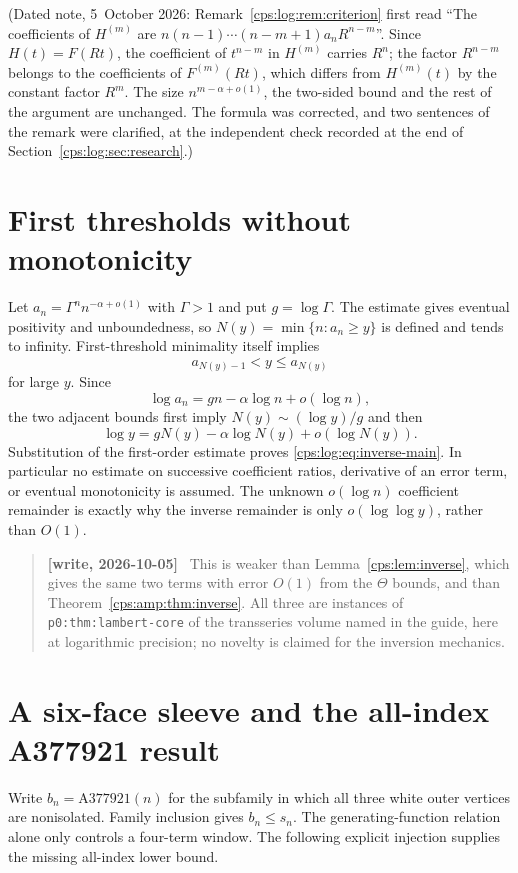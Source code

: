 \documentclass[11pt,letterpaper]{article}
\numberwithin{equation}{section}
\theoremstyle{remark}\newtheorem{remark}[theorem]{Remark}
\newenvironment{writenotelog}{\begin{quote}\small\sloppy\textbf{[write, 2026-10-05]}\ }{\end{quote}}
\begin{document}
\noindent(Dated note, 5~October 2026: Remark~\ref{cps:log:rem:criterion} first read ``The
coefficients of $H^{(m)}$ are $n(n-1)\cdots(n-m+1)a_nR^{n-m}$''. Since $H(t)=F(Rt)$, the
coefficient of $t^{n-m}$ in $H^{(m)}$ carries $R^{n}$; the factor $R^{n-m}$ belongs to the
coefficients of $F^{(m)}(Rt)$, which differs from $H^{(m)}(t)$ by the constant factor $R^{m}$.
The size $n^{m-\alpha+o(1)}$, the two-sided bound and the rest of the argument are unchanged. The
formula was corrected, and two sentences of the remark were clarified, at the independent check
recorded at the end of Section~\ref{cps:log:sec:research}.)

\section{First thresholds without monotonicity}\label{cps:log:sec:inverse}
Let $a_n=\Gamma^n n^{-\alpha+o(1)}$ with $\Gamma>1$ and put
$g=\log\Gamma$. The estimate gives eventual positivity and
unboundedness, so $N(y)=\min\{n:a_n\ge y\}$ is defined and tends
to infinity. First-threshold minimality itself implies
\[
 a_{N(y)-1}<y\le a_{N(y)}
\]
for large $y$. Since
\[
 \log a_n=gn-\alpha\log n+o(\log n),
\]
the two adjacent bounds first imply $N(y)\sim(\log y)/g$ and then
\[
 \log y=gN(y)-\alpha\log N(y)+o(\log N(y)).
\]
Substitution of the first-order estimate proves
\eqref{cps:log:eq:inverse-main}. In particular no estimate on successive
coefficient ratios, derivative of an error term, or eventual
monotonicity is assumed. The unknown $o(\log n)$ coefficient
remainder is exactly why the inverse remainder is only
$o(\log\log y)$, rather than $O(1)$.

\begin{writenotelog}
This is weaker than Lemma~\ref{cps:lem:inverse}, which gives the same two terms with error
$O(1)$ from the $\Theta$ bounds, and than Theorem~\ref{cps:amp:thm:inverse}. All three are
instances of \texttt{p0:thm:lambert-core} of the transseries volume named in the guide, here
at logarithmic precision; no novelty is claimed for the inversion mechanics.
\end{writenotelog}

\section{A six-face sleeve and the all-index A377921 result}\label{cps:log:sec:921}
Write $b_n=\mathrm{A377921}(n)$ for the subfamily in which all three
white outer vertices are nonisolated. Family inclusion gives $b_n\le s_n$.
The generating-function relation alone only controls a four-term
window. The following explicit injection supplies the missing
all-index lower bound.
\end{document}
